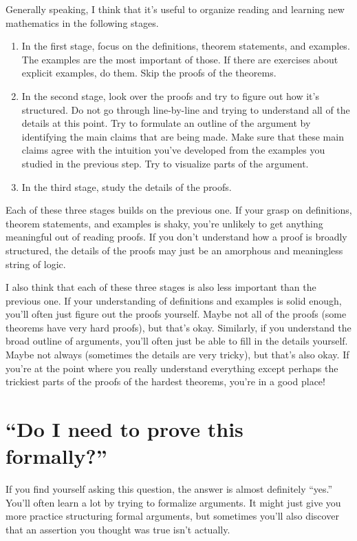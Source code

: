 Generally speaking, I think that it's useful to organize reading and learning new mathematics in the following stages. 
\begin{enumerate}[(1)]
	\item In the first stage, focus on the definitions, theorem statements, and examples. The examples are the most important of those. If there are exercises about explicit examples, do them. Skip the proofs of the theorems. 
	
	\item In the second stage, look over the proofs and try to figure out how it's structured. Do not go through line-by-line and trying to understand all of the details at this point. Try to formulate an outline of the argument by identifying the main claims that are being made. Make sure that these main claims agree with the intuition you've developed from the examples you studied in the previous step. Try to visualize parts of the argument. 
	
	\item In the third stage, study the details of the proofs. 
\end{enumerate}
Each of these three stages builds on the previous one. If your grasp on definitions, theorem statements, and examples is shaky, you're unlikely to get anything meaningful out of reading proofs. If you don't understand how a proof is broadly structured, the details of the proofs may just be an amorphous and meaningless string of logic. 

I also think that each of these three stages is also less important than the previous one. If your understanding of definitions and examples is solid enough, you'll often just figure out the proofs yourself. Maybe not all of the proofs (some theorems have very hard proofs), but that's okay. Similarly, if you understand the broad outline of arguments, you'll often just be able to fill in the details yourself. Maybe not always (sometimes the details are very tricky), but that's also okay. If you're at the point where you really understand everything except perhaps the trickiest parts of the proofs of the hardest theorems, you're in a good place! 

\section*{``Do I need to prove this formally?''}

If you find yourself asking this question, the answer is almost definitely ``yes.'' You'll often learn a lot by trying to formalize arguments. It might just give you more practice structuring formal arguments, but sometimes you'll also discover that an assertion you thought was true isn't actually.  

